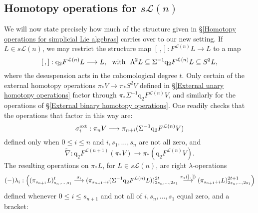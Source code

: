\documentclass[11pt]{amsart} \renewcommand{\baselinestretch}{1.2}
\theoremstyle{plain}
\numberwithin{equation}{section} %
\theoremstyle{plain}
\numberwithin{equation}{chapter} %
\newcommand{\DASH}{\mathrm{-}}
\renewcommand{\to}{\longrightarrow}
\newcommand{\calL}{\mathcal{L}}
\newcommand{\quadgrad}[1]{\mathrm{q}_{#1}}
\newcommand{\SubsectionOrSection}[1]{\subsection{#1}}
\begin{document}
\begin{homotopy operations for PRLs}
\SubsectionOrSection{Homotopy operations for $s\calL(n)$}\label{Homotopy operations for sLn}
We will now state precisely how much of the structure given in \S\ref{Homotopy operations for simplicial Lie algebras} carries over to our new setting. If $L\in s\calL(n)$, we may restrict the structure map $[\,,]:F^{\calL(n)}L\to L$ to a map
\[[\,,]:\quadgrad{2}F^{\calL(n)}L\to L,\textup{\ \ with\ \ }\Lambda^2L\subseteq \Sigma^{-1}\quadgrad{2}F^{\calL(n)}L\subseteq S^2L,\]
where the desuspension acts in the cohomological degree $t$.
Only certain of the external homotopy operations $\pi_*V\to \pi_* S^2V$ defined in \S\ref{External unary homotopy operations} factor through $\pi_*\Sigma^{-1}\quadgrad{2}F^{\calL(n)}V$, and similarly for the operations of \S\ref{External binary homotopy operations}.  One readily checks that the operations that factor in this way are:
\[\sigma_i^\textup{ext}:\pi_nV\to \pi_{n+i}(\Sigma^{-1}\quadgrad{2}F^{\calL(n)}V)\]
defined only when $0\leq i\leq n$ and $i,s_1,\ldots,s_n$ are not all zero, and
\[\widetilde{\nabla}: \quadgrad{2}F^{\calL(n+1)}(\pi_*V)\to \pi_*(\quadgrad{2}F^{\calL(n)}V).\]
The resulting operations on $\pi_*L$, for $L\in s\calL(n)$, 
are right $\lambda$-operations
\[(\DASH)\lambda_i:\Bigl((\pi_{s_{n+1}}L)_{s_n,\ldots,s_1}^t\overset{\sigma_i}{\to}(\pi_{s_{n+1}+i}(\Sigma^{-1}\quadgrad{2}F^{\calL(n)}L))_{2s_n,\ldots,2s_1}^{2t}\overset{\pi_*([\,,\,])}{\to}(\pi_{s_{n+1}+i}L)_{2s_n,\ldots,2s_1}^{2t+1}\Bigr)\]
defined whenever $0\leq i\leq s_{n+1}$ and not all of $i,s_n,\ldots,s_1$ equal zero, and a bracket:

\end{homotopy operations for PRLs}
\end{document}
